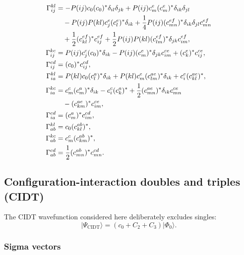 \documentclass[11pt]{article}
\newcommand{\vac}{\Phi_0}
\begin{document}
\begingroup
\small
\begin{align}
 \Gamma^{kl}_{ij}
 &= -P(ij)c_0(c_0)^*\delta_{il}\delta_{jk}
    +P(ij)c_m^e(c_m^e)^*\delta_{ik}\delta_{jl}
 \notag\\
 &\quad
    -P(ij)P(kl)c_j^e(c_l^e)^*\delta_{ik}
    +\frac{1}{4}P(ij)(c_{mn}^{ef})^*
       \delta_{ik}\delta_{jl}c_{mn}^{ef}
 \notag\\
 &\quad
    +\frac{1}{2}(c_{kl}^{ef})^*c_{ij}^{ef}
    +\frac{1}{2}P(ij)P(kl)(c_{lm}^{ef})^*
       \delta_{jk}c_{im}^{ef},
 \\
 \Gamma^{kc}_{ij}
 &= P(ij)c_j^c(c_0)^*\delta_{ik}
    -P(ij)(c_m^e)^*\delta_{jk}c_{im}^{ce}
    +(c_k^e)^*c_{ij}^{ce},
 \\
 \Gamma^{cd}_{ij}
 &= (c_0)^*c_{ij}^{cd},
 \\
 \Gamma^{kl}_{ia}
 &= P(kl)c_0(c_l^a)^*\delta_{ik}
    +P(kl)c_m^e(c_{lm}^{ae})^*\delta_{ik}
    +c_i^e(c_{kl}^{ae})^*,
 \\
 \Gamma^{kc}_{ia}
 &= c_m^c(c_m^a)^*\delta_{ik}
    -c_i^c(c_k^a)^*
    +\frac{1}{2}(c_{mn}^{ae})^*\delta_{ik}c_{mn}^{ce}
 \notag\\
 &\quad
    -(c_{km}^{ae})^*c_{im}^{ce},
 \\
 \Gamma^{cd}_{ia}
 &= (c_m^a)^*c_{im}^{cd},
 \\
 \Gamma^{kl}_{ab}
 &= c_0(c_{kl}^{ab})^*,
 \\
 \Gamma^{kc}_{ab}
 &= c_m^c(c_{km}^{ab})^*,
 \\
 \Gamma^{cd}_{ab}
 &= \frac{1}{2}(c_{mn}^{ab})^*c_{mn}^{cd}.
\end{align}
\endgroup


\clearpage
\subsection{Configuration-interaction doubles and triples (CIDT)}

The CIDT wavefunction considered here deliberately excludes singles:
\begin{equation}
 \lvert\Psi_{\mathrm{CIDT}}\rangle
 = (c_0+C_2+C_3)\lvert\vac\rangle.
\end{equation}

\subsubsection{Sigma vectors}
\end{document}
